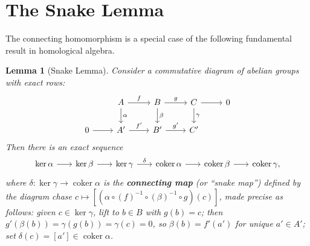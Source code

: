 \documentclass[12pt,a4paper,openany]{book}
\theoremstyle{definition}
\theoremstyle{plain}
\newtheorem{lemma}[definition]{Lemma}
\theoremstyle{remark}
\DeclareMathOperator{\coker}{coker}
\begin{document}
\section{The Snake Lemma}\label{sec:snake-lemma}

The connecting homomorphism is a special case of the following
fundamental result in homological algebra.

\begin{lemma}[Snake Lemma]\label{lem:snake}
Consider a commutative diagram of abelian groups with exact rows:
\[
\begin{tikzcd}
  & A \ar[r,"f"] \ar[d,"\alpha"] & B \ar[r,"g"] \ar[d,"\beta"] & C \ar[r] \ar[d,"\gamma"] & 0 \\
  0 \ar[r] & A' \ar[r,"f'"] & B' \ar[r,"g'"] & C'
\end{tikzcd}
\]
Then there is an exact sequence
\[
\begin{tikzcd}[column sep=1.8em]
  \ker\alpha \ar[r] & \ker\beta \ar[r] & \ker\gamma
    \ar[r,"\delta",out=0,in=180,looseness=1.5,overlay]
  & \coker\alpha \ar[r] & \coker\beta \ar[r] & \coker\gamma,
\end{tikzcd}
\]
where $\delta\colon\ker\gamma\to\coker\alpha$ is the \textbf{connecting
map} (or ``snake map'') defined by the diagram chase
$c\mapsto [(\alpha\circ(f)^{-1}\circ(\beta)^{-1}\circ g)(c)]$, made
precise as follows: given $c\in\ker\gamma$, lift to $b\in B$ with
$g(b)=c$; then $g'(\beta(b))=\gamma(g(b))=\gamma(c)=0$, so
$\beta(b)=f'(a')$ for unique $a'\in A'$; set $\delta(c)=[a']\in\coker\alpha$.
\end{lemma}
\end{document}
